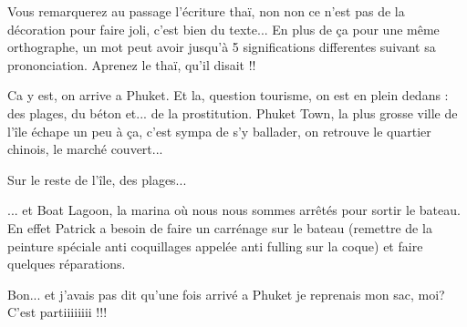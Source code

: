 \begin{multicols}{2}

Vous remarquerez au passage l'écriture thaï, non non ce n'est pas de la décoration pour faire joli, c'est bien du texte... En plus de ça pour une même orthographe, un mot peut avoir jusqu'à 5 significations differentes suivant sa prononciation. Aprenez le thaï, qu'il disait !!

Ca y est, on arrive a Phuket. Et la, question tourisme, on est en plein dedans : des plages, du béton et... de la prostitution. Phuket Town, la plus grosse ville de l'île échape un peu à ça, c'est sympa de s'y ballader, on retrouve le quartier chinois, le marché couvert...


Sur le reste de l'île, des plages...


... et Boat Lagoon, la marina où nous nous sommes arrêtés pour sortir le bateau. En effet Patrick a besoin de faire un carrénage sur le bateau (remettre de la peinture spéciale anti coquillages appelée anti fulling sur la coque) et faire quelques réparations.




Bon... et j'avais pas dit qu'une fois arrivé a Phuket je reprenais mon sac, moi? C'est partiiiiiiii !!!


\end{multicols}

